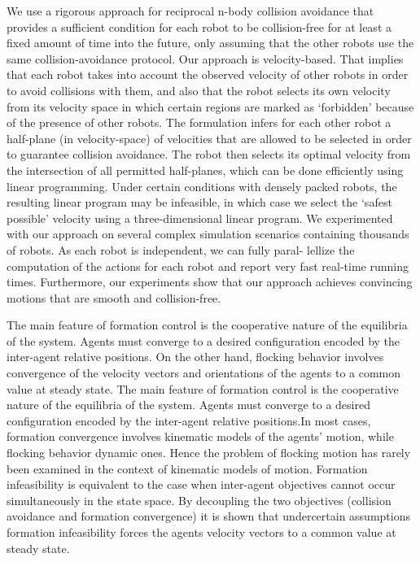 \documentclass[12pt]{report}
\begin{document}
We use a rigorous approach for reciprocal n-body collision avoidance that provides a sufficient condition for each robot to be collision-free for at least a fixed amount of time into the future, only assuming that the other robots use the same collision-avoidance protocol. Our approach is velocity-based. That implies that each robot takes into account the observed velocity of other robots in order to avoid collisions with them, and also that the robot selects its own velocity from its velocity space in which certain regions are marked as ‘forbidden’ because of the presence of other robots. The formulation infers for each other robot a half-plane (in velocity-space) of velocities that are allowed to be selected in order to guarantee collision avoidance. The robot then selects its optimal velocity from the intersection of all permitted half-planes, which can be done efficiently using linear programming. Under certain conditions with densely packed robots, the resulting linear program may be infeasible, in which case we select the ‘safest possible’ velocity using a three-dimensional linear program.
We experimented with our approach on several complex simulation scenarios
containing thousands of robots. As each robot is independent, we can fully paral-
lellize the computation of the actions for each robot and report very fast real-time
running times. Furthermore, our experiments show that our approach achieves convincing motions that are smooth and collision-free.

The main feature of  formation control  is the cooperative nature of the equilibria of the system. Agents  must converge to a desired configuration encoded by the inter-agent relative positions.  On the other hand, flocking behavior involves convergence of the velocity vectors and orientations of the agents to a common value at steady state. The main feature of formation control is the cooperative nature of the equilibria of the system. Agents must converge to a desired configuration encoded by the inter-agent relative positions.In  most cases, formation convergence involves kinematic models of the agents’ motion, while  flocking behavior dynamic ones. Hence the problem of flocking motion has rarely been examined in the context of kinematic models of motion. Formation infeasibility is  equivalent to the case when inter-agent objectives cannot occur simultaneously in the state space. By decoupling the two objectives (collision avoidance and formation convergence) it is shown that undercertain assumptions formation infeasibility forces the agents velocity vectors to a common value at steady state.
\end{document}
